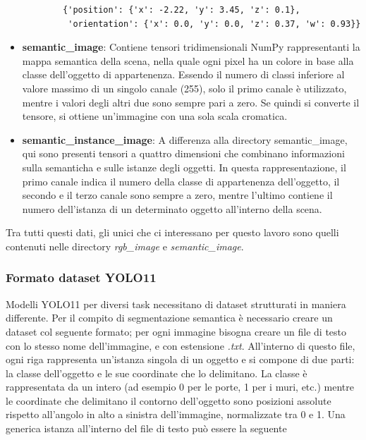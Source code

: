 \documentclass[12pt]{report}
\begin{document}
\begin{itemize}
	\begin{verbatim}
		{'position': {'x': -2.22, 'y': 3.45, 'z': 0.1},
		 'orientation': {'x': 0.0, 'y': 0.0, 'z': 0.37, 'w': 0.93}}
	\end{verbatim}
	
	\item \textbf{semantic\_image}: Contiene tensori tridimensionali NumPy rappresentanti la mappa semantica della scena, nella quale ogni pixel ha un colore in base alla classe dell'oggetto di appartenenza. Essendo il numero di classi inferiore al valore massimo di un singolo canale (255), solo il primo canale è utilizzato, mentre i valori degli altri due sono sempre pari a zero. Se quindi si converte il tensore, si ottiene un'immagine con una sola scala cromatica.
	
	\item \textbf{semantic\_instance\_image}: A differenza alla directory semantic\_image, qui sono presenti tensori a quattro dimensioni che combinano informazioni sulla semanticha e sulle istanze degli oggetti. In questa rappresentazione, il primo canale indica il numero della classe di appartenenza dell'oggetto, il secondo e il terzo canale sono sempre a zero, mentre l'ultimo contiene il numero dell'istanza di un determinato oggetto all'interno della scena.
\end{itemize}

Tra tutti questi dati, gli unici che ci interessano per questo lavoro sono quelli contenuti nelle directory \textit{rgb\_image} e \textit{semantic\_image}.

\subsubsection{Formato dataset YOLO11}
\label{sec:formato_dataset_yolo11}

Modelli YOLO11 per diversi task necessitano di dataset strutturati in maniera differente. Per il compito di segmentazione semantica è necessario creare un dataset col seguente formato; per ogni immagine bisogna creare un file di testo con lo stesso nome dell'immagine, e con estensione \textit{.txt}. All'interno di questo file, ogni riga rappresenta un'istanza singola di un oggetto e si compone di due parti: la classe dell'oggetto e le sue coordinate che lo delimitano. La classe è rappresentata da un intero (ad esempio 0 per le porte, 1 per i muri, etc.) mentre le coordinate che delimitano il contorno dell'oggetto sono posizioni assolute rispetto all'angolo in alto a sinistra dell'immagine, normalizzate tra 0 e 1. Una generica istanza all'interno del file di testo può essere la seguente
\end{document}
